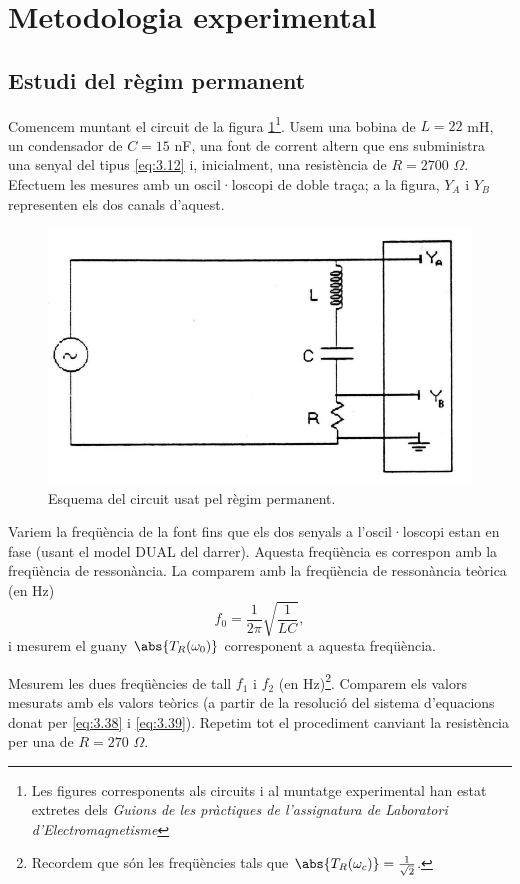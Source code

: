 \documentclass[a4paper,10.5pt]{report}
\begin{document}
\section{Metodologia experimental}

\subsection{Estudi del règim permanent}\label{expermento permanente}

Comencem muntant el circuit de la figura \ref{fig:3.2}\footnote{Les figures corresponents als circuits i al muntatge experimental han estat extretes dels \textit{Guions de les pràctiques de l'assignatura de Laboratori d'Electromagnetisme}\cite{ref3}}. Usem una bobina de $L = 22$ mH, un condensador de $C = 15$ nF, una font de corrent altern que ens subministra una senyal del tipus \eqref{eq:3.12}  i, inicialment, una resistència de $R = 2700$ $\Omega$. Efectuem les mesures amb un oscil·loscopi de doble traça; a la figura, $Y_A$ i $Y_B$ representen els dos canals d'aquest.

\begin{figure}[h]
	\centering
	\includegraphics[width=0.5\linewidth]{screenshot005}
	\caption{Esquema del circuit usat pel règim permanent.}
	\label{fig:3.2}
\end{figure}

Variem la freqüència de la font fins que els dos senyals a l'oscil·loscopi estan en fase (usant el model DUAL del darrer). Aquesta freqüència es correspon amb la freqüència de ressonància. La comparem amb la freqüència de ressonància teòrica (en Hz)
\begin{equation}
	f_0 = \frac{1}{2\pi}\sqrt{\frac{1}{LC}}, \label{eq:3.41}
\end{equation}
i mesurem el guany $\abs{T_R(\omega_0)}$ corresponent a aquesta freqüència.

Mesurem les dues freqüències de tall $f_1$ i $f_2$ (en Hz)\footnote{Recordem que són les freqüències tals que $\abs{T_R(\omega_c)} = \frac{1}{\sqrt{2}}$.}. Comparem els valors mesurats amb els valors teòrics (a partir de la resolució del sistema d'equacions donat per \eqref{eq:3.38} i \eqref{eq:3.39}). Repetim tot el procediment canviant la resistència per una de $R = 270$ $\Omega$.
\end{document}
